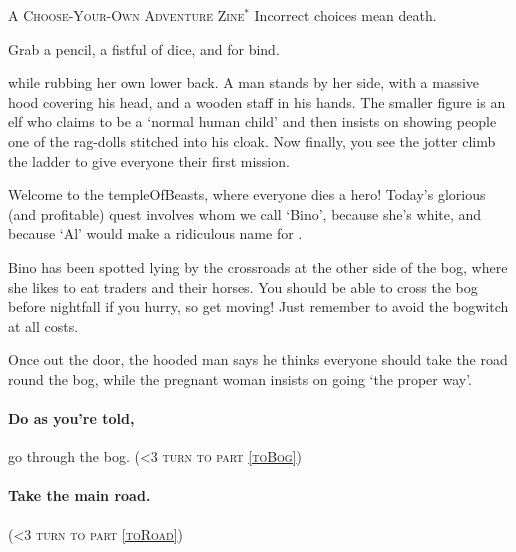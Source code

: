 \documentclass[10pt,twoside]{book}
\newcommand*\goTo[1]{({\scshape\ifnum\value{list}<3 turn to \fi part \vref{#1}})}
\begin{document}
\frontmatter
{}

\begin{center}
  
  \par
  \vspace{3\baselineskip}
  {\Large\scshape A Choose-Your-Own Adventure Zine$^{*}$}
  \vfill\null
  \ast\tiny Incorrect choices mean death.
\end{center}

\pagebreak


\setcounter{page}{1}
\pagestyle{plain}
\small

\noindent
Grab a pencil, a fistful of dice, and  for \gls{bind}.

while rubbing her own lower back.
A man stands by her side, with a massive hood covering his head, and a wooden staff in his hands.
The smaller figure is an elf who claims to be a `normal human child' and then insists on showing people one of the rag-dolls stitched into his cloak.
Now finally, you see the \gls{jotter} climb the ladder to give everyone their first mission.

\begin{speechtext}
  Welcome to the \gls{templeOfBeasts}, where everyone dies a hero!
  Today's glorious (and profitable) quest involves  whom we call `Bino', because she's white, and because `Al' would make a ridiculous name for .

  Bino has been spotted lying by the crossroads at the other side of the bog, where she likes to eat traders and their horses.
  You should be able to cross the bog before nightfall if you hurry, so get moving!
  Just remember to avoid the \gls{bogwitch} at all costs.
\end{speechtext}

Once out the door, the hooded man says he thinks everyone should take the road round the bog, while the pregnant woman insists on going `the proper way'.

\paragraph{Do as you're told,}
go through the bog.
\goTo{toBog}

\paragraph{Take the main road.}
\goTo{toRoad}
\end{document}
